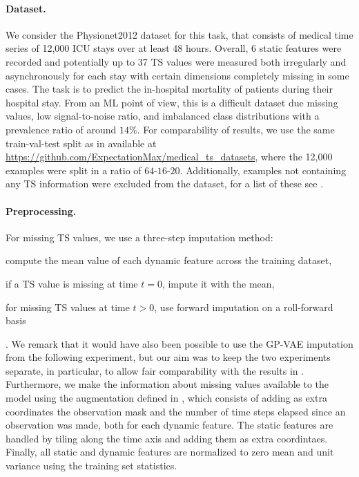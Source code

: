 \documentclass{article} \usepackage{iclr2021_conference,times}
\theoremstyle{plain}
\theoremstyle{definition}
\begin{document}
\paragraph{Dataset.} We consider the {\sc Physionet2012} dataset for this task, that consists of medical time series of 12,000 ICU stays over at least 48 hours. Overall, 6 static features were recorded and potentially up to 37 TS values were measured both irregularly and asynchronously for each stay with certain dimensions completely missing in some cases. The task is to predict the in-hospital mortality of patients during their hospital stay. From an ML point of view, this is a difficult dataset due missing values, low signal-to-noise ratio, and imbalanced class distributions with a prevalence ratio of around $14 \%$. For comparability of results, we use the same train-val-test split as in \citet{horn2020set} available at \url{https://github.com/ExpectationMax/medical_ts_datasets}, where the 12,000 examples were split in a ratio of $64$-$16$-$20$. Additionally, examples not containing any TS information were excluded from the dataset, for a list of these see \citet[App.~A.1]{horn2020set}. 

\paragraph{Preprocessing.} For missing TS values, we use a three-step imputation method: \begin{enumerate*}[label=(\arabic*)] \item compute the mean value of each dynamic feature across the training dataset, \item if a TS value is missing at time $t=0$, impute it with the mean, \item for missing TS values at time $t > 0$, use forward imputation on a roll-forward basis \end{enumerate*}. We remark that it would have also been possible to use the GP-VAE imputation from the following experiment, but our aim was to keep the two experiments separate, in particular, to allow fair comparability with the results in \citet{horn2020set}. Furthermore, we make the information about missing values available to the model using the augmentation defined in \citet[eq.~9]{che2018recurrent}, which consists of adding as extra coordinates the observation mask and the number of time steps elapsed since an observation was made, both for each dynamic feature. The static features are handled by tiling along the time axis and adding them as extra coordintaes. Finally, all static and dynamic features are normalized to zero mean and unit variance using the training set statistics. 
\end{document}
